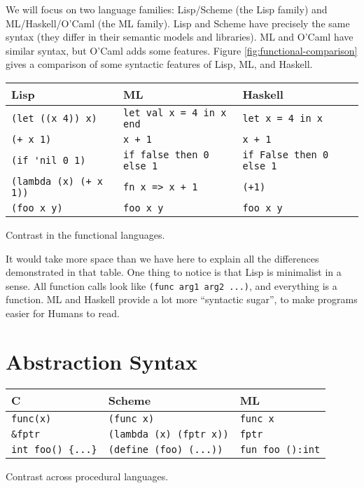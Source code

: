 \documentclass[12pt]{article}
\begin{document}
We will focus on two language families: Lisp/Scheme (the Lisp family)
and ML/Haskell/O'Caml (the ML family). Lisp and Scheme have precisely
the same syntax (they differ in their semantic models and libraries).
ML and O'Caml have similar syntax, but O'Caml adds some features.  Figure
\ref{fig:functional-comparison} gives a comparison of some syntactic
features of Lisp, ML, and Haskell.

\begin{Figure}
\label{fig:functional-comparison}
\begin{tabular}{l|l|l}
\textbf{Lisp}            & \textbf{ML}                   & \textbf{Haskell} \\
\hline
\verb+(let ((x 4)) x)+   & \verb+let val x = 4 in x end+ & \verb+let x = 4 in x+ \\
\verb|(+ x 1)|           & \verb|x + 1|                  & \verb|x + 1| \\
\verb|(if 'nil 0 1)|     & \verb+if false then 0 else 1+ & \verb+if False then 0 else 1+ \\
\verb|(lambda (x) (+ x 1))| & \verb|fn x => x + 1|       & \verb|(+1)| \\
\verb|(foo x y)|         & \verb|foo x y|                & \verb|foo x y| \\
\end{tabular}
\caption{Contrast in the functional languages.}
\end{Figure}

It would take more space than we have here to explain all the
differences demonstrated in that table.  One thing to notice is that
Lisp is minimalist in a sense.  All function calls look like
\texttt{(func arg1 arg2 ...)}, and everything is a function.  ML and
Haskell provide a lot more ``syntactic sugar'', to make programs easier
for Humans to read.

\section{Abstraction Syntax}

\begin{Figure}
\label{fig:procedural-comparison}
\begin{tabular}{l|l|l}
\textbf{C}     & \textbf{Scheme} & \textbf{ML} \\
\hline
\verb+func(x)+ & \verb+(func x)+              & \verb+func x+ \\
\verb+&fptr+   & \verb+(lambda (x) (fptr x))+ & \verb+fptr+ \\
\verb+int foo() {...}+ & \verb+(define (foo) (...))+ & \verb+fun foo ():int+ \\
\end{tabular}
\caption{Contrast across procedural languages.}
\end{Figure}
\end{document}
